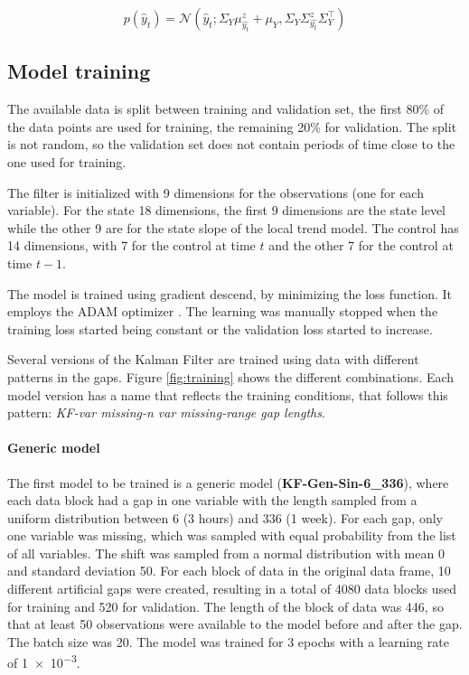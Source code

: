 \documentclass{article}
\newcommand{\norm}[3]{\mathcal{N}\left(#1; #2, #3\right)} %
\let\Oldsubsection\subsection
\renewcommand{\subsection}{\FloatBarrier\Oldsubsection}
\begin{document}
\begin{equation*}
    p(\hat{y}_t) = \norm{\hat{y}_t}{\Sigma_Y\mu^z_{\hat{y_t}} + \mu_Y}{\Sigma_Y\Sigma^z_{\hat{y_t}}\Sigma_Y^\top}
\end{equation*}

\subsection{Model training}

The available data is split between training and validation set, the first 80\% of the data points are used for training, the remaining 20\% for validation. The split is not random, so the validation set does not contain periods of time close to the one used for training.

The filter is initialized with 9 dimensions for the observations (one for each variable). For the state 18 dimensions, the first 9 dimensions are the state level while the other 9 are for the state slope of the local trend model. The control has 14 dimensions, with 7 for the control at time $t$ and the other 7 for the control at time $t-1$.

The model is trained using gradient descend, by minimizing the loss function. It employs the ADAM optimizer \cite{kingma_adam_2017}. The learning was manually stopped when the training loss started being constant or the validation loss started to increase.

Several versions of the Kalman Filter are trained using data with different patterns in the gaps. Figure \ref{fig:training} shows the different combinations. Each model version has a name that reflects the training conditions, that follows this pattern: \textit{KF-\textlangle var missing\textrangle-\textlangle n var missing\textrangle-\textlangle range gap lengths}.

\paragraph{Generic model} The first model to be trained is a generic model (\textbf{KF-Gen-Sin-6\_336}), where each data block had a gap in one variable with the length sampled from a uniform distribution between \num{6} (3 hours) and \num{336} (1 week). For each gap, only one variable was missing, which was sampled with equal probability from the list of all variables. The shift was sampled from a normal distribution with mean 0 and standard deviation 50. For each block of data in the original data frame, 10 different artificial gaps were created, resulting in a total of 4080 data blocks used for training and 520 for validation. 
The length of the block of data was \num{446}, so that at least \num{50} observations were available to the model before and after the gap. The batch size was \num{20}. 
The model was trained for \num{3} epochs with a learning rate of \num{1e-3}.
\end{document}
